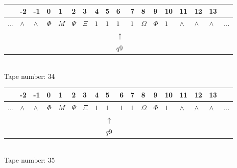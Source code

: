 \documentclass[11pt]{article}
\begin{document}
\begin{table}[H]
\centering
\begin{tabular}{llllllllllllllllll}
 & -2 & -1 & 0 & 1 & 2 & 3 & 4 & 5 & 6 & 7 & 8 & 9 & 10 & 11 & 12 & 13 & \\
\hline
$...$ & \multicolumn{1}{|l|}{$\wedge$} & \multicolumn{1}{|l|}{$\wedge$} & \multicolumn{1}{|l|}{$\Phi$} & \multicolumn{1}{|l|}{$M$} & \multicolumn{1}{|l|}{$\Psi$} & \multicolumn{1}{|l|}{$\Xi$} & \multicolumn{1}{|l|}{$1$} & \multicolumn{1}{|l|}{$1$} & \multicolumn{1}{|l|}{$1$} & \multicolumn{1}{|l|}{$1$} & \multicolumn{1}{|l|}{$\Omega$} & \multicolumn{1}{|l|}{$\Phi$} & \multicolumn{1}{|l|}{$1$} & \multicolumn{1}{|l|}{$\wedge$} & \multicolumn{1}{|l|}{$\wedge$} & \multicolumn{1}{|l|}{$\wedge$} & $...$\\
\hline
&  &  &  &  &  &  &  &  & $\uparrow$ &  &  &  &  &  &  &  &  \\
&  &  &  &  &  &  &  &  & $ q9 $ &  &  &  &  &  &  &  &  \\
\end{tabular}
\\
Tape number: 34
\noindent\makebox[\linewidth]{\hdashrule{\textwidth}{1pt}{1pt}}\end{table}

\begin{table}[H]
\centering
\begin{tabular}{llllllllllllllllll}
 & -2 & -1 & 0 & 1 & 2 & 3 & 4 & 5 & 6 & 7 & 8 & 9 & 10 & 11 & 12 & 13 & \\
\hline
$...$ & \multicolumn{1}{|l|}{$\wedge$} & \multicolumn{1}{|l|}{$\wedge$} & \multicolumn{1}{|l|}{$\Phi$} & \multicolumn{1}{|l|}{$M$} & \multicolumn{1}{|l|}{$\Psi$} & \multicolumn{1}{|l|}{$\Xi$} & \multicolumn{1}{|l|}{$1$} & \multicolumn{1}{|l|}{$1$} & \multicolumn{1}{|l|}{$1$} & \multicolumn{1}{|l|}{$1$} & \multicolumn{1}{|l|}{$\Omega$} & \multicolumn{1}{|l|}{$\Phi$} & \multicolumn{1}{|l|}{$1$} & \multicolumn{1}{|l|}{$\wedge$} & \multicolumn{1}{|l|}{$\wedge$} & \multicolumn{1}{|l|}{$\wedge$} & $...$\\
\hline
&  &  &  &  &  &  &  & $\uparrow$ &  &  &  &  &  &  &  &  &  \\
&  &  &  &  &  &  &  & $ q9 $ &  &  &  &  &  &  &  &  &  \\
\end{tabular}
\\
Tape number: 35
\noindent\makebox[\linewidth]{\hdashrule{\textwidth}{1pt}{1pt}}\end{table}
\clearpage
\end{document}

